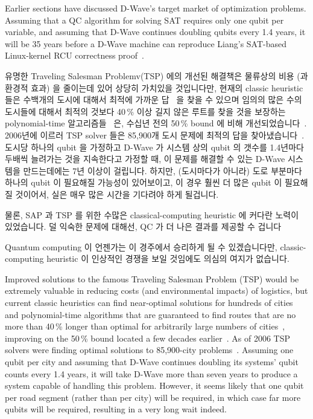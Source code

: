Earlier sections have discussed D-Wave's target market of optimization
problems.
Assuming that a QC algorithm for solving SAT requires only one qubit
per variable, and assuming that D-Wave continues doubling qubits every
1.4 years, it will be 35 years before a D-Wave machine can reproduce
Liang's SAT-based Linux-kernel RCU correctness
proof~\cite{LihaoLiang2016VerifyTreeRCU}.
\fi

유명한 Traveling Salesman Problemv(TSP) 에의 개선된 해결책은 물류상의 비용 (과
환경적 효과) 을 줄이는데 있어 상당히 가치있을 것입니다만, 현재의 classic
heuristic 들은 수백개의 도시에 대해서 최적에 가까운
답~\cite{Martin:1992:LMC:2307953.2308141} 을 찾을 수 있으며 임의의 많은 수의
도시들에 대해서 최적의 것보다 40\,\% 이상 길지 않은 루트를 찾을 것을 보장하는
polynomial-time 알고리즘들~\cite{Sebo:2014:STN:2688265.2688281} 은, 수십년 전의
50\,\% bound 에 비해
개선되었습니다~\cite{NicosChristofides1976TSP-FiftyPercent}.
2006년에 이르러 TSP solver 들은 85,900개 도시 문제에 최적의 답을
찾아냈습니다~\cite{DLApplegate2007TSPtextbook}.
도시당 하나의 qubit 을 가정하고 D-Wave 가 시스템 상의 qubit 의 갯수를 1.4년마다
두배씩 늘려가는 것을 지속한다고 가정할 때, 이 문제를 해결할 수 있는 D-Wave
시스템을 만드는데에는 7년 이상이 걸립니다.
하지만, (도시마다가 아니라) 도로 부분마다 하나의 qubit 이 필요해질 가능성이
있어보이고, 이 경우 훨씬 더 많은 qubit 이 필요해질 것이어서, 실은 매우 많은
시간을 기다려야 하게 될겁니다.

물론, SAP 과 TSP 를 위한 수많은 classical-computing heuristic 에 커다란 노력이
있었습니다.
덜 익숙한 문제에 대해선, QC 가 더 나은 결과를 제공할 수
겁니다~\cite{JohnPreskill2018NISQ}

Quantum computing 이 언젠가는 이 경주에서 승리하게 될 수 있겠습니다만,
classic-computing heuristic 이 인상적인 경쟁을 보일 것임에도 의심의 여지가
없습니다.
\iffalse

Improved solutions to the famous Traveling Salesman Problem (TSP) would
be extremely valuable in reducing costs (and environmental impacts)
of logistics, but current classic heuristics can find near-optimal
solutions for hundreds of cities~\cite{Martin:1992:LMC:2307953.2308141}
and polynomial-time algorithms that are guaranteed to find routes
that are no more than 40\,\% longer than optimal for arbitrarily
large numbers of cities~\cite{Sebo:2014:STN:2688265.2688281},
improving on the 50\,\% bound located a few decades
earlier~\cite{NicosChristofides1976TSP-FiftyPercent}.
As of 2006 TSP solvers were finding optimal solutions to
85,900-city problems~\cite{DLApplegate2007TSPtextbook}.
Assuming one qubit per city and assuming that D-Wave continues doubling
its systems' qubit counts every 1.4 years, it will take D-Wave more than seven
years to produce a system capable of handling this problem.
However, it seems likely that one qubit per road segment (rather than per city)
will be required, in which case far more qubits will be required,
resulting in a very long wait indeed.

